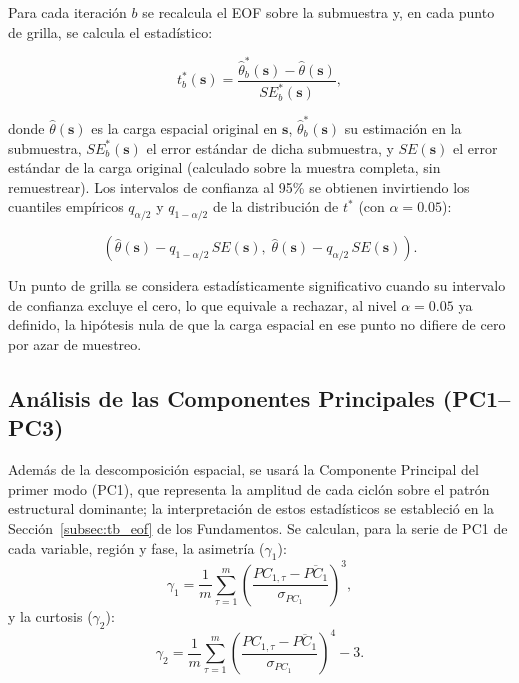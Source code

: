 Para cada iteración $b$ se recalcula el EOF sobre la submuestra y, en cada punto de grilla, se calcula el estadístico:

\begin{equation}\label{eq:bootstrap_t_espacial}
    t^*_b(\mathbf{s}) = \frac{\hat{\theta}^*_b(\mathbf{s}) - \hat{\theta}(\mathbf{s})}{SE^*_b(\mathbf{s})},
\end{equation}

donde $\hat{\theta}(\mathbf{s})$ es la carga espacial original en $\mathbf{s}$, $\hat{\theta}^*_b(\mathbf{s})$ su estimación en la submuestra, $SE^*_b(\mathbf{s})$ el error estándar de dicha submuestra, y $SE(\mathbf{s})$ el error estándar de la carga original (calculado sobre la muestra completa, sin remuestrear). Los intervalos de confianza al 95\% se obtienen invirtiendo los cuantiles empíricos $q_{\alpha/2}$ y $q_{1-\alpha/2}$ de la distribución de $t^*$ (con $\alpha = 0.05$):

\begin{equation}\label{eq:bootstrap_ci_espacial}
    \left(\hat{\theta}(\mathbf{s}) - q_{1-\alpha/2}\,SE(\mathbf{s}),\; \hat{\theta}(\mathbf{s}) - q_{\alpha/2}\,SE(\mathbf{s})\right).
\end{equation}

Un punto de grilla se considera estadísticamente significativo cuando su intervalo de confianza excluye el cero, lo que equivale a rechazar, al nivel $\alpha = 0.05$ ya definido, la hipótesis nula de que la carga espacial en ese punto no difiere de cero por azar de muestreo.

\subsection{Análisis de las Componentes Principales (PC1--PC3)}\label{subsec:analisis_pc}

Además de la descomposición espacial, se usará la Componente Principal del primer modo (PC1), que representa la amplitud de cada ciclón sobre el patrón estructural dominante; la interpretación de estos estadísticos se estableció en la Sección~\ref{subsec:tb_eof} de los Fundamentos. 
Se calculan, para la serie de PC1 de cada variable, región y fase, la asimetría ($\gamma_1$):
\begin{equation}\label{eq:pc1_asimetria}
    \gamma_1 = \frac{1}{m} \sum_{\tau=1}^{m} \left(\frac{PC_{1,\tau} - \overline{PC_1}}{\sigma_{PC_1}}\right)^3,
\end{equation}
y la curtosis ($\gamma_2$):
\begin{equation}\label{eq:pc1_curtosis}
    \gamma_2 = \frac{1}{m} \sum_{\tau=1}^{m} \left(\frac{PC_{1,\tau} - \overline{PC_1}}{\sigma_{PC_1}}\right)^4 - 3.
\end{equation}

